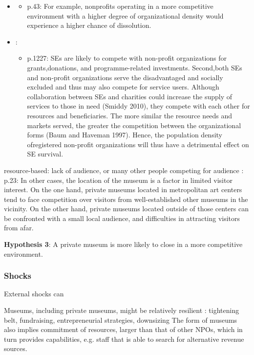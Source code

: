 \documentclass[12pt]{article}
\begin{document}
\begin{itemize}
\begin{itemize}
\end{itemize}
\item \cite{Lu_Shon_Zhang_2019_dissolution}
\begin{itemize}
\item p.43: For example, nonprofits operating in a more competitive environment with a higher degree of organizational density would experience a higher chance of dissolution.
\end{itemize}
\item \cite{Haugh_etal_2021_nascent}:
\begin{itemize}
\item p.1227: SEs are likely to compete with non-profit organizations for grants,donations, and programme-related investments. Second,both SEs and non-profit organizations serve the disadvantaged and socially excluded and thus may also compete for service users. Although collaboration between SEs and charities could increase the supply of services to those in need (Smiddy 2010), they compete with each other for resources and beneficiaries. The more similar the resource needs and markets served, the greater the competition between the organizational forms (Baum and Haveman 1997). Hence, the population density ofregistered non-profit organizations will thus have a detrimental effect on SE survival.
\end{itemize}
\end{itemize}

resource-based: lack of audience, or many other people competing for audience
\cite{Velthuis_Gera_forthcoming_fragility}:
p.23: In other cases, the location of the museum is a factor in limited visitor interest. On the
one hand, private museums located in metropolitan art centers tend to face competition over
visitors  from  well-established  other  museums  in  the  vicinity.  On  the  other  hand,  private
museums located outside of those centers can be confronted with a small local audience, and
difficulties in attracting visitors from afar.

\textbf{Hypothesis 3}: A private museum is more likely to close in a more competitive environment.



\subsubsection*{Shocks}

External shocks can 


Museums, including private museums, might be relatively resilient \cite{Geller_Salamon_2010_resilience}: 
tightening belt, fundraising, entrepreneurial strategies, downsizing
The form of museums also implies commitment of resources, larger than that of other NPOs, which in turn provides capabilities, e.g. staff that is able to search for alternative revenue sources.
\end{document}
